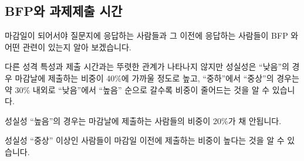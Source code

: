 \documentclass[
]{book}
\begin{document}
\subsection{BFP와 과제제출 시간}\label{bfpuxc640-uxacfcuxc81cuxc81cuxcd9c-uxc2dcuxac04-1}

마감일이 되어서야 질문지에 응답하는 사람들과 그 이전에 응답하는 사람들이 BFP 와 어떤 관련이 있는지 알아 보겠습니다.

다른 성격 특성과 제출 시간과는 뚜렷한 관계가 나타나지 않지만 성실성은 ``낮음''의 경우 마감날에 제출하는 비중이 40\%에 가까울 정도로 높고, ``중하''에서 ``중상''의 경우는 약 30\% 내외로 ``낮음''에서 ``높음'' 순으로 갈수록 비중이 줄어드는 것을 알 수 있습니다.

성실성 ``높음''의 경우는 마감날에 제출하는 사람들의 비중이 20\%가 채 안됩니다.

성실성 ``중상'' 이상인 사람들이 마감일 이전에 제출하는 비중이 높다는 것을 알 수 있습니다.
\end{document}
